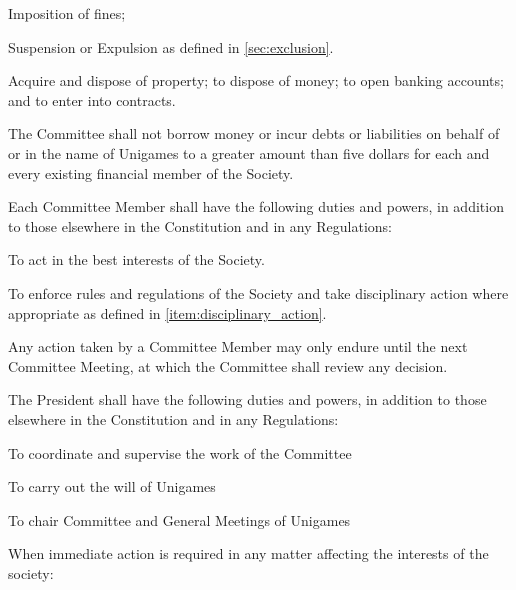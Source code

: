 \documentclass[a4paper]{article}
\begin{document}
\begin{myEnumerate}
\begin{myEnumerate}
\begin{myEnumerate}
                    \item Imposition of fines;
                    \item Suspension or Expulsion as defined in \cref{sec:exclusion}.
                \end{myEnumerate}
            \item Acquire and dispose of property; to dispose of money; to open banking accounts; and to enter into contracts.
                \begin{myEnumerate}
                    \item The Committee shall not borrow money or incur debts or liabilities on behalf of or in the name of Unigames to a greater amount than five dollars for each and every existing financial member of the Society.
                \end{myEnumerate}
        \end{myEnumerate}
    \item Each Committee Member shall have the following duties and powers, in addition to those elsewhere in the Constitution and in any Regulations:
        \begin{myEnumerate}
            \item To act in the best interests of the Society.
            \item To enforce rules and regulations of the Society and take disciplinary action where appropriate as defined in \cref{item:disciplinary_action}.
                \begin{myEnumerate}
                    \item Any action taken by a Committee Member may only endure until the next Committee Meeting, at which the Committee shall review any decision.
                \end{myEnumerate}
        \end{myEnumerate}
    \item \label{item:pres_duties} The President shall have the following duties and powers, in addition to those elsewhere in the Constitution and in any Regulations:
        \begin{myEnumerate}
            \item To coordinate and supervise the work of the Committee
            \item To carry out the will of Unigames
            \item To chair Committee and General Meetings of Unigames
            \item When immediate action is required in any matter affecting the interests of the society:

\end{myEnumerate}
\end{myEnumerate}
\end{document}
